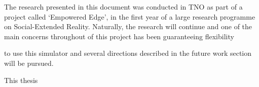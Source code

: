 \begin{center}
    \LARGE {}
\end{center}

\vspace{1cm}

The research presented in this document was conducted in TNO as part of a project called ‘Empowered Edge’, in the first year of a large research programme on Social-Extended Reality. Naturally, the research will continue and one of the main concerns throughout of this project has been guaranteeing flexibility 


to use this simulator and several directions described in the future work section will be pursued.


This thesis






